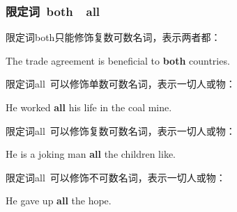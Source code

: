 \documentclass[UTF8]{ctexart}
\newcommand{\littf}[1]{{\hspace{3pt}\ttfamily #1}}
\begin{document}
\subsubsection{限定词~\littf{both}~~\littf{all}}
    限定词\littf{both}只能修饰复数可数名词，表示两者都：
    \begin{center}
        \large\ttfamily
        The trade agreement is beneficial to \textbf{both} countries.\\[6mm]
    \end{center}
    限定词\littf{all~}可以修饰单数可数名词，表示一切人或物：
    \begin{center}
        \large\ttfamily
        He worked \textbf{all} his life in the coal mine.\\[6mm]
    \end{center}
    限定词\littf{all~}可以修饰复数可数名词，表示一切人或物：
    \begin{center}
        \large\ttfamily
        He is a joking man \textbf{all} the children like.\\[6mm]
    \end{center}
    限定词\littf{all~}可以修饰不可数名词，表示一切人或物：
    \begin{center}
        \large\ttfamily
        He gave up \textbf{all} the hope.
    \end{center}
\end{document}
